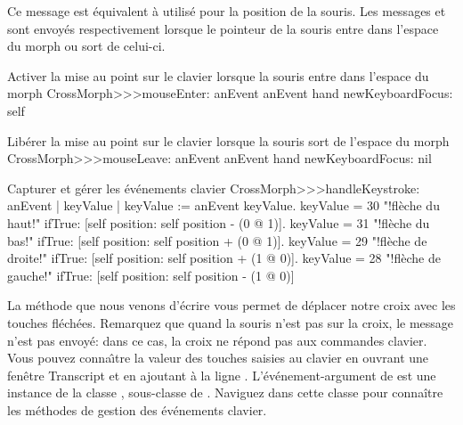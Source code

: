 \documentclass[a4paper,10pt,twoside]{book}
\begin{document}
\noindent
Ce message est \'equivalent \`a 
utilis\'e pour la position de la souris.
Les messages  et
 sont envoy\'es respectivement lorsque le
pointeur de la souris entre dans l'espace du morph ou sort de celui-ci.

\begin{method}{Activer la mise au point sur le clavier lorsque la souris entre dans l'espace du morph}
CrossMorph>>>mouseEnter: anEvent
	anEvent hand newKeyboardFocus: self
\end{method}

\begin{method}{Lib\'erer la mise au point sur le clavier lorsque la souris sort de l'espace du morph}
CrossMorph>>>mouseLeave: anEvent
	anEvent hand newKeyboardFocus: nil
\end{method}

\begin{method}[handleKeystroke]{Capturer et g\'erer les \'ev\'enements clavier}
CrossMorph>>>handleKeystroke: anEvent
	| keyValue |
	keyValue := anEvent keyValue.
	keyValue = 30	 "!fl\`eche du haut!"
		ifTrue: [self position: self position - (0 @ 1)].
	keyValue = 31	 "!fl\`eche du bas!"
		ifTrue: [self position: self position + (0 @ 1)].
	keyValue = 29	 "!fl\`eche de droite!"
		ifTrue: [self position: self position + (1 @ 0)].
	keyValue = 28	 "!fl\`eche de gauche!"
		ifTrue: [self position: self position - (1 @ 0)]
\end{method}

La m\'ethode que nous venons d'\'ecrire vous permet de d\'eplacer
notre croix avec les touches fl\'ech\'ees. Remarquez que quand la
souris n'est pas sur la croix, le message
 n'est pas envoy\'e: dans ce cas, la croix
ne r\'epond pas aux commandes clavier.
Vous pouvez conna\^{\i}tre la valeur des touches saisies au clavier en
ouvrant une fen\^etre Transcript et en ajoutant \`a 
 la ligne 
 .
L'\'ev\'enement-argument  de  est une
instance de la classe , sous-classe de
. Naviguez dans cette classe pour conna\^itre les
m\'ethodes de gestion des \'ev\'enements clavier.
\end{document}
